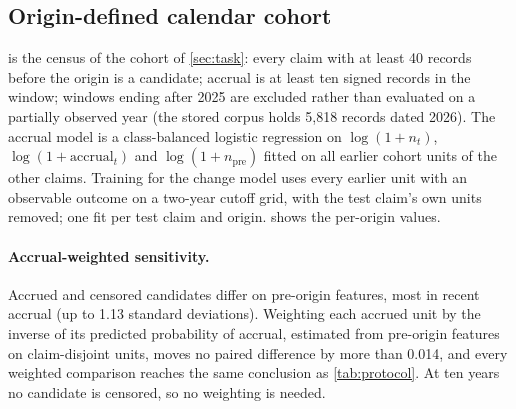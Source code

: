 \documentclass[11pt]{article}
\begin{document}
\subsection{Origin-defined calendar cohort}
\label{app:cohort}
 is the census of the cohort of \cref{sec:task}: every claim with at least
40 records before the origin is a candidate; accrual is at least ten signed records in the window;
windows ending after 2025 are excluded rather than evaluated on a partially observed year (the
stored corpus holds 5{,}818 records dated 2026). The accrual model is a class-balanced logistic
regression on $\log(1+n_t)$, $\log(1+\text{accrual}_t)$ and $\log(1+n_{\text{pre}})$ fitted on
all earlier cohort units of the other claims. Training for the change model uses every earlier
unit with an observable outcome on a two-year cutoff grid, with the test claim's own units removed;
one fit per test claim and origin.  shows the per-origin values.

\paragraph{Accrual-weighted sensitivity.} Accrued and censored candidates differ on pre-origin
features, most in recent accrual (up to 1.13 standard deviations). Weighting each accrued unit by the
inverse of its predicted probability of accrual, estimated from pre-origin features on claim-disjoint
units, moves no paired difference by more than 0.014, and every weighted comparison reaches the same
conclusion as \cref{tab:protocol}. At ten years no candidate is censored, so no weighting is needed.
\end{document}
